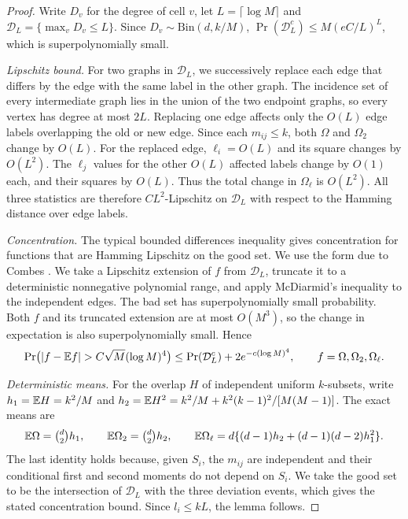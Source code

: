 \begin{proof}
Write $D_v$ for the degree of cell $v$, let $L=\lceil\log M\rceil$ and $\mathcal D_L=\{\max_vD_v\le L\}$. Since $D_v\sim\mathrm{Bin}(d,k/M)$, $\Pr(\mathcal D_L^c)\le M(eC/L)^L$, which is superpolynomially small.

\emph{Lipschitz bound.} For two graphs in $\mathcal D_L$, we successively replace each edge that differs by the edge with the same label in the other graph. The incidence set of every intermediate graph lies in the union of the two endpoint graphs, so every vertex has degree at most $2L$. Replacing one edge affects only the $O(L)$ edge labels overlapping the old or new edge. Since each $m_{ij}\le k$, both $\Omega$ and $\Omega_2$ change by $O(L)$. For the replaced edge, $\ell_i=O(L)$ and its square changes by $O(L^2)$. The $\ell_j$ values for the other $O(L)$ affected labels change by $O(1)$ each, and their squares by $O(L)$. Thus the total change in $\Omega_\ell$ is $O(L^2)$. All three statistics are therefore $CL^2$-Lipschitz on $\mathcal D_L$ with respect to the Hamming distance over edge labels.

\emph{Concentration.} The typical bounded differences inequality \cite{warnke2016typical} gives concentration for functions that are Hamming Lipschitz on the good set. We use the form due to Combes \cite[Proposition~2]{combes2015mcdiarmid}. We take a Lipschitz extension of $f$ from $\mathcal D_L$, truncate it to a deterministic nonnegative polynomial range, and apply McDiarmid's inequality to the independent edges. The bad set has superpolynomially small probability. Both $f$ and its truncated extension are at most $O(M^3)$, so the change in expectation is also superpolynomially small. Hence
\[
\Pr\bigl(|f-\E f|>C\sqrt M(\log M)^4\bigr)\le\Pr(\mathcal D_L^c)+2e^{-c(\log M)^4},\qquad f=\Omega,\Omega_2,\Omega_\ell.
\]

\emph{Deterministic means.} For the overlap $H$ of independent uniform $k$-subsets, write $h_1=\mathbb E H=k^2/M$ and $h_2=\mathbb E H^2=k^2/M+k^2(k-1)^2/[M(M-1)]$. The exact means are
\[
\mathbb E\Omega=\tbinom d2h_1,\qquad\mathbb E\Omega_2=\tbinom d2h_2,\qquad\mathbb E\Omega_\ell=d\{(d-1)h_2+(d-1)(d-2)h_1^2\}.
\]
The last identity holds because, given $S_i$, the $m_{ij}$ are independent and their conditional first and second moments do not depend on $S_i$. We take the good set to be the intersection of $\mathcal D_L$ with the three deviation events, which gives the stated concentration bound. Since $l_i\le kL$, the lemma follows.
\end{proof}
